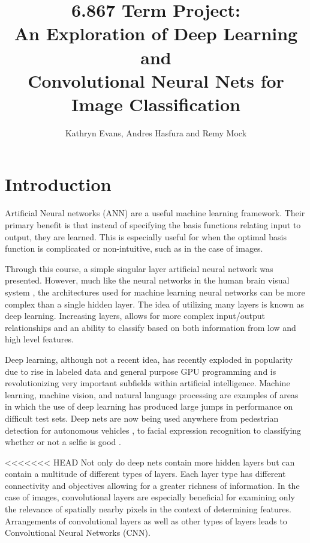 \documentclass[12pt, twocolumn]{article}
\begin{document}
\title{ 6.867 Term Project: \\ An Exploration of Deep Learning and \\ Convolutional Neural Nets for Image Classification\\ }
 \author{Kathryn Evans, Andres Hasfura and Remy Mock}
\maketitle

\section{ Introduction} 
Artificial Neural networks (ANN) are a useful machine learning framework. Their primary benefit is that instead of specifying the basis functions relating input to output, they are learned.  This is especially useful for when the optimal basis function is complicated or non-intuitive, such as in the case of images.


Through this course, a simple singular layer artificial neural network was presented. However, much like the neural networks in the human brain visual system , the architectures used for machine learning neural networks can be more complex than a single hidden layer. The idea of utilizing many layers is known as deep learning.  Increasing layers, allows for more complex input/output relationships and an ability to classify based on both information from low and high level features.

Deep learning, although not a recent idea, has recently exploded in popularity due to rise in labeled data and general purpose GPU programming and is revolutionizing very important subfields within artificial intelligence. Machine learning, machine vision, and natural language processing are examples of areas in which the use of deep learning has produced large jumps in performance on difficult test sets. Deep nets are now being used anywhere from pedestrian detection for autonomous vehicles \cite{Szarvas2006}, to facial expression recognition \cite{Li2015} to classifying whether or not a selfie is good \cite{Karpathy}. 
	
<<<<<<< HEAD
Not only do deep nets contain more hidden layers but can contain a multitude of different types of layers. Each layer type has different connectivity and objectives allowing for a greater richness of information. In the case of images, convolutional layers are especially beneficial for examining only the relevance of spatially nearby pixels in the context of determining features. Arrangements of convolutional layers as well as other types of layers leads to Convolutional Neural Networks (CNN). 
\end{document}
